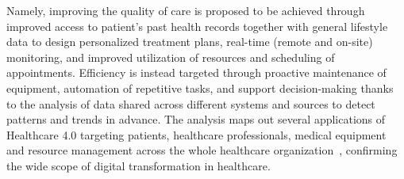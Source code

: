 Namely, improving the quality of care is proposed to be achieved through improved access to patient's past health records together with general lifestyle data to design personalized treatment plans, real-time (remote and on-site) monitoring, and improved utilization of resources and scheduling of appointments.
%
Efficiency is instead targeted through proactive maintenance of equipment, automation of repetitive tasks, and support decision-making thanks to the analysis of data shared across different systems and sources to detect patterns and trends in advance.
%
The analysis maps out several applications of Healthcare 4.0 targeting patients, healthcare professionals, medical equipment and resource management across the whole healthcare organization~\cite{Al-Jaroodi_Mohamed_Abukhousa_2020}, confirming the wide scope of digital transformation in healthcare.


